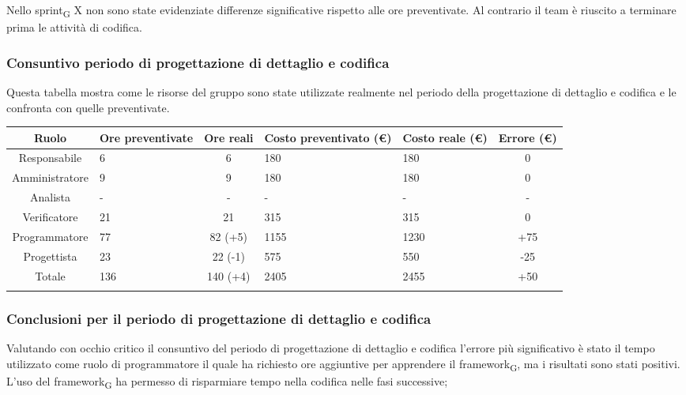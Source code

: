 Nello sprint\textsubscript{G} X non sono state evidenziate differenze significative rispetto alle ore preventivate. Al contrario il team è riuscito a terminare prima le attività di codifica.

\newpage
\subsubsection{Consuntivo periodo di progettazione di dettaglio e codifica}
Questa tabella mostra come le risorse del gruppo sono state utilizzate realmente nel periodo della progettazione di dettaglio e codifica e le confronta con quelle preventivate.

\setlength\extrarowheight{5pt}
\begin{tabularx}{\textwidth}{|c|XcXX|c|}
	\hline
	\rowcolor{white}
	\textbf{Ruolo} & \textbf{Ore preventivate} & \textbf{Ore reali} & \textbf{Costo preventivato (€)} & \textbf{Costo reale (€)} & \textbf{Errore (€)} \\
	\hline
	Responsabile & 6 & 6 & 180 & 180 & 0 \\
	Amministratore & 9 & 9 & 180 & 180 & 0 \\
	Analista & - & - & - & - & - \\
	Verificatore & 21 & 21 & 315 & 315 & 0 \\
	Programmatore & 77 & 82 (+5) & 1155 & 1230 & +75 \\
	Progettista & 23 & 22 (-1) & 575 & 550 & -25 \\
	\hline
	Totale & 136 & 140 (+4) & 2405 & 2455 & +50 \\
	\hline
	\rowcolor{white}
	\caption{Consuntivo ore e costi per ruolo durante il periodo di progettazione di dettaglio e codifica}
\end{tabularx}

\subsubsection{Conclusioni per il periodo di progettazione di dettaglio e codifica}

Valutando con occhio critico il consuntivo del periodo di progettazione di dettaglio e codifica l'errore
più significativo è stato il tempo utilizzato come ruolo di programmatore il quale ha richiesto ore aggiuntive per apprendere il framework\textsubscript{G}, ma i risultati sono stati positivi. 
L'uso del framework\textsubscript{G} ha permesso di risparmiare tempo nella codifica nelle fasi successive;

